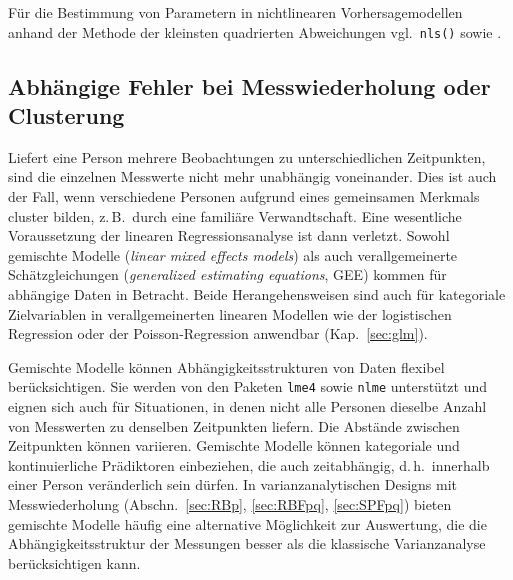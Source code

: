 Für die Bestimmung von Parametern in nichtlinearen Vorhersagemodellen anhand der Methode der kleinsten quadrierten Abweichungen vgl.\ \lstinline!nls()! sowie .

\subsection{Abhängige Fehler bei Messwiederholung oder Clusterung}
\label{sec:lmLongitudinal}

Liefert eine Person mehrere Beobachtungen zu unterschiedlichen Zeitpunkten, sind die einzelnen Messwerte nicht mehr unabhängig voneinander. Dies ist auch der Fall, wenn verschiedene Personen aufgrund eines gemeinsamen Merkmals cluster bilden, z.\,B.\ durch eine familiäre Verwandtschaft. Eine wesentliche Voraussetzung der linearen Regressionsanalyse ist dann verletzt. Sowohl gemischte Modelle (\emph{linear mixed effects models}) als auch verallgemeinerte Schätzgleichungen (\emph{generalized estimating equations}, GEE) kommen für abhängige Daten in Betracht. Beide Herangehensweisen sind auch für kategoriale Zielvariablen in verallgemeinerten linearen Modellen wie der logistischen Regression oder der Poisson-Regression anwendbar (Kap.\ \ref{sec:glm}).

Gemischte Modelle \cite{Pinheiro2000, West2006} können Abhängigkeitsstrukturen von Daten flexibel berücksichtigen. Sie werden von den Paketen \lstinline!lme4! \cite{Bates2008} sowie \lstinline!nlme! \cite{Pinheiro2008} unterstützt und eignen sich auch für Situationen, in denen nicht alle Personen dieselbe Anzahl von Messwerten zu denselben Zeitpunkten liefern. Die Abstände zwischen Zeitpunkten können variieren. Gemischte Modelle können kategoriale und kontinuierliche Prädiktoren einbeziehen, die auch zeitabhängig, d.\,h.\ innerhalb einer Person veränderlich sein dürfen. In varianzanalytischen Designs mit Messwiederholung (Abschn.\ \ref{sec:RBp}, \ref{sec:RBFpq}, \ref{sec:SPFpq}) bieten gemischte Modelle häufig eine alternative Möglichkeit zur Auswertung, die die Abhängigkeitsstruktur der Messungen besser als die klassische Varianzanalyse berücksichtigen kann.

